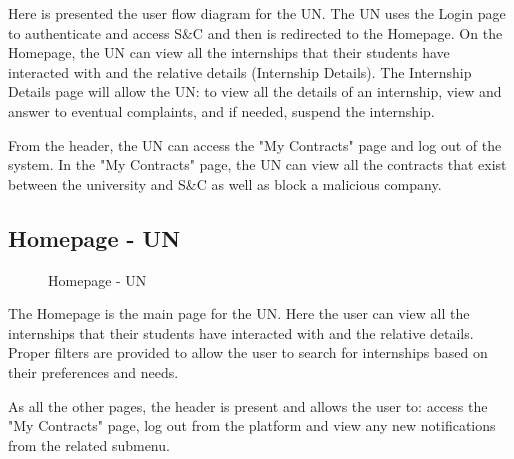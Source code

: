 \par Here is presented the user flow diagram for the UN. The UN uses the Login page to authenticate and access S\&C and
then is redirected to the Homepage. On the Homepage, the UN can view all the internships that their students have
interacted with and the relative details (Internship Details). The Internship Details page will allow the UN: to view
all the details of an internship, view and answer to eventual complaints, and if needed, suspend the internship.

\par From the header, the UN can access the "My Contracts" page and log out of the system. In the "My Contracts" page,
the UN can view all the contracts that exist between the university and S\&C as well as block a malicious company.

\subsection{Homepage - UN}
\label{subsec:homepage-un}%

\begin{figure}[H]
    \centering
    \caption{Homepage - UN}
    \label{fig:homepage-un}
\end{figure}

\par The Homepage is the main page for the UN. Here the user can view all the internships that their students have
interacted with and the relative details. Proper filters are provided to allow the user to search for internships based
on their preferences and needs.

\par As all the other pages, the header is present and allows the user to: access the "My Contracts" page, log out from
the platform and view any new notifications from the related submenu.

